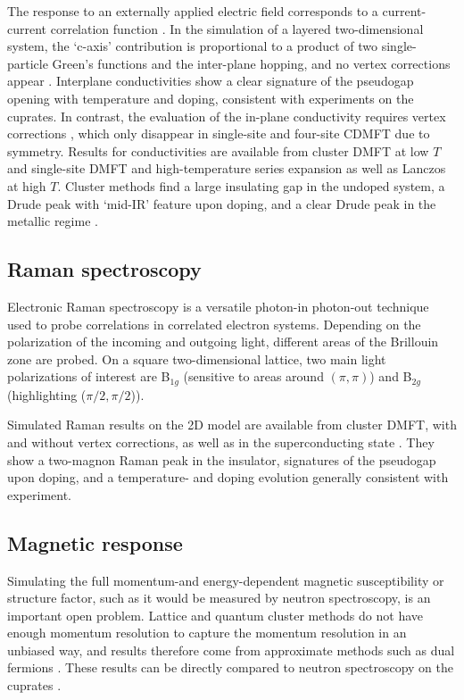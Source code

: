 \documentclass{ar-1col}
\begin{document}
The response to an externally applied electric field corresponds to a current-current correlation function \cite{Basov05}. In the simulation of a layered two-dimensional system, the `c-axis' contribution is proportional to a product of two single-particle Green's functions and the inter-plane hopping, and no vertex corrections appear \cite{Ferrero10,Lin10}.  Interplane conductivities show a clear signature of the pseudogap opening with temperature and doping, consistent with experiments on the cuprates. In contrast, the evaluation of the in-plane conductivity requires vertex corrections \cite{Lin09,Lin10}, which only disappear in single-site \cite{Jarrell95} and four-site CDMFT \cite{Haule07B} due to symmetry. Results for conductivities are available from cluster DMFT at low $T$ and single-site DMFT and high-temperature series expansion \cite{Perepelitsky16} as well as Lanczos \cite{Vucicevic19} at high $T$. 
Cluster methods find a large insulating gap in the undoped system, a Drude peak with `mid-IR' feature upon doping, and a clear Drude peak in the metallic regime \cite{Lin10}.
\begin{marginnote}
\end{marginnote}

\subsection{Raman spectroscopy}
Electronic Raman spectroscopy \cite{LeTacon06,Devereaux07} is a versatile photon-in photon-out technique used to probe correlations in correlated electron systems. Depending on the polarization of the incoming and outgoing light, different areas of the Brillouin zone are probed. On a square two-dimensional lattice, two main light polarizations  of interest are B$_{1g}$ (sensitive to areas around $(\pi,\pi)$) and B$_{2g}$ (highlighting ($\pi/2,\pi/2$)). 

Simulated Raman results on the 2D model are available from cluster DMFT, with \cite{Lin12} and without \cite{Lin10,Sakai13} vertex corrections, as well as in the superconducting state \cite{Gull13B}. They show a  two-magnon Raman peak in the insulator, signatures of the pseudogap upon doping, and a temperature- and doping evolution generally consistent with experiment.
\subsection{Magnetic response}
Simulating the full momentum-and energy-dependent magnetic susceptibility or structure factor, such as it would be measured by neutron spectroscopy, is an important open problem. Lattice and quantum cluster methods do not have enough momentum resolution to capture the momentum resolution in an unbiased way, and results therefore come from approximate methods such as dual fermions \cite{LeBlanc19,Li20A}. These results can be directly compared to neutron spectroscopy on the cuprates \cite{Coldea01}.
\end{document}
